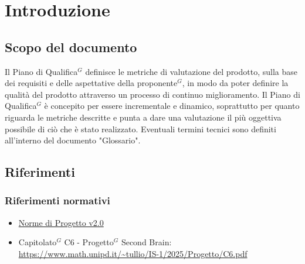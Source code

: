 \documentclass[a4paper,10pt]{article}
\begin{document}
\newpage

\tableofcontents

\newpage

\section{Introduzione}
\subsection{Scopo del documento}
Il Piano di Qualifica$^G$ definisce le metriche di valutazione del prodotto, sulla base dei requisiti e delle aspettative della proponente$^G$, in modo da poter definire la qualità del prodotto attraverso un processo di continuo miglioramento.
Il Piano di Qualifica$^G$ è concepito per essere incrementale e dinamico, soprattutto per quanto riguarda le metriche descritte e punta a dare una valutazione il più oggettiva possibile di ciò che è stato realizzato. Eventuali termini tecnici sono definiti all'interno del documento "Glossario".
\subsection{Riferimenti}
\subsubsection{Riferimenti normativi}
\begin{itemize}
    \item \href{https://tool-8.github.io/Documentazione-SWE/pb/Norme_di_Progetto_v2.0.pdf}{Norme di Progetto v2.0}
    \item Capitolato$^G$ C6 - Progetto$^G$ Second Brain:    \\ \url{https://www.math.unipd.it/~tullio/IS-1/2025/Progetto/C6.pdf}
\end{itemize}
\end{document}
